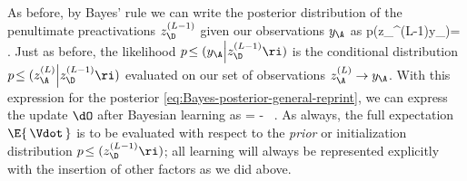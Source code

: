 As before, by Bayes' rule we can write the posterior distribution of the penultimate preactivations $z_\D^{(L-1)}$ given our observations $y_\A$ as
\be\label{eq:Bayes-posterior-general-reprint}
p\!\le(z_{\D}^{(L-1)}\Big\vert y_\A \ri)=\, .
\ee
Just as before, the likelihood $p\!\le(y_\A \Big\vert z_{\D}^{(L-1)} \ri)$ is the conditional distribution $p\!\le(z_\A^{(L)} \Big\vert z_{\D}^{(L-1)} \ri)$ evaluated on our set of observations $z_{\A}^{(L)} \to y_\A$. With this expression for the posterior \eqref{eq:Bayes-posterior-general-reprint}, 
we can express the update $\dO$ after Bayesian learning as
\be\label{eq:different-of-expectations}
\dO = - \, .
\ee
As always, the full expectation $\E{\,\Vdot\,}$ is to be evaluated with respect to the \emph{prior} or initialization distribution $p\!\le(z_{\D}^{(L-1)} \ri)$; all learning will always be represented explicitly with the insertion of other factors as we did above.

